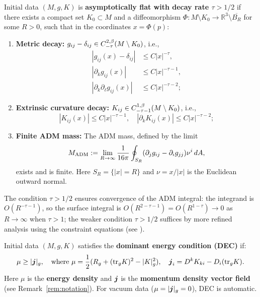 \begin{definition}\label{def:AF}
Initial data $(M, g, K)$ is \textbf{asymptotically flat with decay rate $\tau > 1/2$} if there exists a compact set $K_0 \subset M$ and a diffeomorphism $\Phi: M \setminus K_0 \to \mathbb{R}^3 \setminus \overline{B_R}$ for some $R > 0$, such that in the coordinates $x = \Phi(p)$:
\begin{enumerate}
    \item[(AF1)] \textbf{Metric decay:} $g_{ij} - \delta_{ij} \in C^{2,\beta}_{-\tau}(M \setminus K_0)$, i.e.,
    \[
    \begin{aligned}
    |g_{ij}(x) - \delta_{ij}| &\leq C|x|^{-\tau}, \\
    |\partial_k g_{ij}(x)| &\leq C|x|^{-\tau-1}, \\
    |\partial_k\partial_\ell g_{ij}(x)| &\leq C|x|^{-\tau-2};
    \end{aligned}
    \]
    \item[(AF2)] \textbf{Extrinsic curvature decay:} $K_{ij} \in C^{1,\beta}_{-\tau-1}(M \setminus K_0)$, i.e.,
    \[
    |K_{ij}(x)| \leq C|x|^{-\tau-1}, \quad |\partial_k K_{ij}(x)| \leq C|x|^{-\tau-2};
    \]
    \item[(AF3)] \textbf{Finite ADM mass:} The ADM mass, defined by the limit
    \[
    M_{\mathrm{ADM}} := \lim_{R \to \infty} \frac{1}{16\pi}\oint_{S_R}(\partial_j g_{ij} - \partial_i g_{jj})\nu^i \, dA,
    \]
    exists and is finite. Here $S_R = \{|x| = R\}$ and $\nu = x/|x|$ is the Euclidean outward normal.
\end{enumerate}
The condition $\tau > 1/2$ ensures convergence of the ADM integral: the integrand is $O(R^{-\tau-1})$, so the surface integral is $O(R^{2-\tau-1}) = O(R^{1-\tau}) \to 0$ as $R \to \infty$ when $\tau > 1$; the weaker condition $\tau > 1/2$ suffices by more refined analysis using the constraint equations (see \cite[Theorem 4.2]{bartnik1986}).
\end{definition}

\begin{definition}\label{def:DEC}
Initial data $(M, g, K)$ satisfies the \textbf{dominant energy condition (DEC)} if:
\[
\mu \geq |\boldsymbol{j}|_g, \quad \text{where } \mu = \frac{1}{2}(R_g + (\mathrm{tr}_g K)^2 - |K|_g^2), \quad \boldsymbol{j}_i = D^k K_{ki} - D_i(\mathrm{tr}_g K).
\]
Here $\mu$ is the \textbf{energy density} and $\boldsymbol{j}$ is the \textbf{momentum density vector field} (see Remark~\ref{rem:notation}).
For vacuum data ($\mu = |\boldsymbol{j}|_g = 0$), DEC is automatic.
\end{definition}

